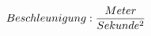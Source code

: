 \documentclass[preview]{standalone}
\begin{document}
\begin{align*}
\special{dvisvgm:raw <g id='unique000'>}Beschleunigung: \frac{Meter}{Sekunde^{2}}\special{dvisvgm:raw </g>}
\end{align*}
\end{document}
